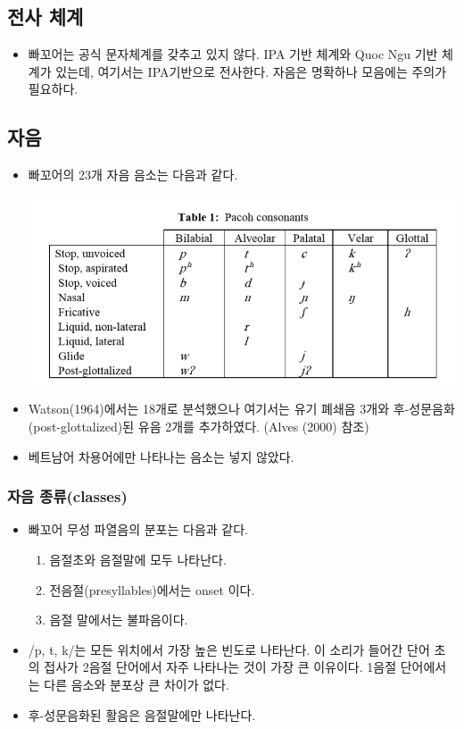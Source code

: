 \subsection{전사 체계}
\begin{itemize} 
\item 빠꼬어는 공식 문자체계를 갖추고 있지 않다. IPA 기반 체계와 Quoc Ngu 기반 체계가 있는데, 여기서는 IPA기반으로 전사한다. 자음은 명확하나 모음에는 주의가 필요하다.
\end{itemize}

\subsection{자음}
\begin{itemize}
\item 빠꼬어의 23개 자음 음소는 다음과 같다.
\begin{center}
\includegraphics[width=.8\linewidth]{Pacoh/src/Pacohconsonants.png}
\end{center}
\item Watson(1964)에서는 18개로 분석했으나 여기서는 유기 폐쇄음 3개와 후-성문음화(post-glottalized)된 유음 2개를 추가하였다. (Alves (2000) 참조)

\item 베트남어 차용어에만 나타나는 음소는 넣지 않았다.
\end{itemize}

\subsubsection{자음 종류(classes)}
\begin{itemize}
\item 빠꼬어 무성 파열음의 분포는 다음과 같다.
\begin{enumerate}
\item 음절초와 음절말에 모두 나타난다.
\item 전음절(presyllables)에서는 onset 이다.
\item 음절 말에서는 불파음이다.
\end{enumerate}
\item /p, t, k/는 모든 위치에서 가장 높은 빈도로 나타난다. 이 소리가 들어간 단어 초의 접사가 2음절 단어에서 자주 나타나는 것이 가장 큰 이유이다. 1음절 단어에서는 다른 음소와 분포상 큰 차이가 없다.
\item 후-성문음화된 활음은 음절말에만 나타난다.
\end{itemize}

